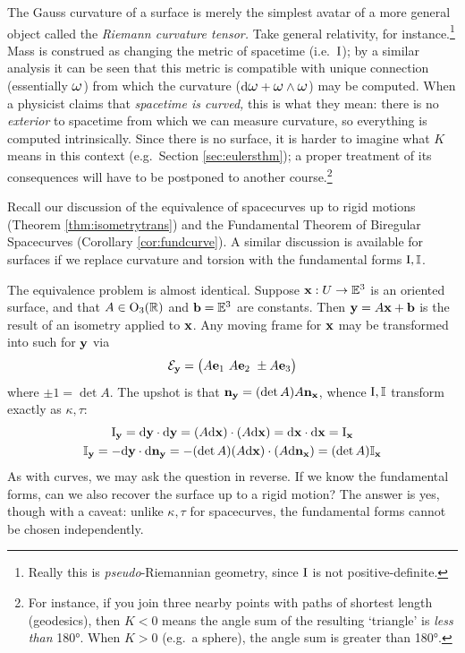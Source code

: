 The Gauss curvature of a surface is merely the simplest avatar of a more general object called the \emph{Riemann curvature tensor.} Take general relativity, for instance.\footnote{Really this is \emph{pseudo}-Riemannian geometry, since $\mathrm{I}$ is not positive-definite.} Mass is construed as changing the metric of spacetime (i.e.\ $\mathrm{I}$); by a similar analysis it can be seen that this metric is compatible with unique connection (essentially $\lomega$) from which the curvature ($\D\lomega+\lomega\wedge\lomega$) may be computed. When a physicist claims that \emph{spacetime is curved,} this is what they mean: there is no \emph{exterior} to spacetime from which we can measure curvature, so everything is computed intrinsically. Since there is no surface, it is harder to imagine what $K$ means in this context (e.g.\ Section \ref{sec:eulersthm}); a proper treatment of its consequences will have to be postponed to another course.\footnote{For instance, if you join three nearby points with paths of shortest length (geodesics), then $K<0$ means the angle sum of the resulting `triangle' is \emph{less than} \ang{180}. When $K>0$ (e.g.\ a sphere), the angle sum is greater than \ang{180}. %
}


Recall our discussion of the equivalence of spacecurves up to rigid motions (Theorem \ref{thm:isometrytrans}) and the Fundamental Theorem of Biregular Spacecurves (Corollary \ref{cor:fundcurve}). A similar discussion is available for surfaces if we replace curvature and torsion with the fundamental forms $\mathrm{I},\mathbb{I}$.\smallbreak

The equivalence problem is almost identical. Suppose ${\mathbf{x}}:U\to\mathbb{E}^3$ is an oriented surface, and that $A\in\mathrm{O}_3(\mathbb{R})$ and ${\mathbf{b}}=\mathbb{E}^3$ are constants. Then ${\mathbf{y}}=A{\mathbf{x}}+{\mathbf{b}}$ is the result of an isometry applied to ${\mathbf{x}}$. Any moving frame for ${\mathbf{x}}$ may be transformed into such for ${\mathbf{y}}$ via
\[\mathcal{E}_{\mathbf{y}}=\bigl(A{\mathbf{e}}_1\ A{\mathbf{e}}_2\ \pm A{\mathbf{e}}_3\bigr)\]
where $\pm 1=\det A$. The upshot is that ${\mathbf{n}}_{\mathbf{y}}=(\det A)A{\mathbf{n}}_{\mathbf{x}}$, whence $\mathrm{I},\mathbb{I}$ transform exactly as $\kappa,\tau$:
\begin{gather*}
\mathrm{I}_{\mathbf{y}}=\mathrm{d}{\mathbf{y}}\cdot\mathrm{d}{\mathbf{y}}=(A\mathrm{d}{\mathbf{x}})\cdot (A\mathrm{d}{\mathbf{x}}) = \mathrm{d}{\mathbf{x}}\cdot\mathrm{d}{\mathbf{x}}=\mathrm{I}_{\mathbf{x}}\\
\mathbb{I}_{\mathbf{y}}=-\mathrm{d}{\mathbf{y}}\cdot\mathrm{d}{\mathbf{n}}_{\mathbf{y}}=-(\det A)(A\mathrm{d}{\mathbf{x}})\cdot (A\mathrm{d}{\mathbf{n}}_{\mathbf{x}}) = (\det A)\mathbb{I}_{\mathbf{x}}
\end{gather*}
As with curves, we may ask the question in reverse. If we know the fundamental forms, can we also recover the surface up to a rigid motion? The answer is yes, though with a caveat: unlike $\kappa,\tau$ for spacecurves, the fundamental forms cannot be chosen independently.

